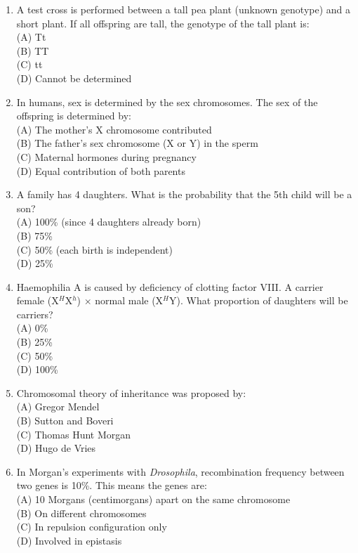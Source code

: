 \documentclass{article}
\begin{document}
\begin{enumerate}[label=Q\arabic*.]
\item A test cross is performed between a tall pea plant (unknown genotype) and a short plant. If all offspring are tall, the genotype of the tall plant is:
\\(A) Tt
\\(B) TT
\\(C) tt
\\(D) Cannot be determined

\item In humans, sex is determined by the sex chromosomes. The sex of the offspring is determined by:
\\(A) The mother's X chromosome contributed
\\(B) The father's sex chromosome (X or Y) in the sperm
\\(C) Maternal hormones during pregnancy
\\(D) Equal contribution of both parents

\item A family has 4 daughters. What is the probability that the 5th child will be a son?
\\(A) 100\% (since 4 daughters already born)
\\(B) 75\%
\\(C) 50\% (each birth is independent)
\\(D) 25\%

\item Haemophilia A is caused by deficiency of clotting factor VIII. A carrier female (X$^H$X$^h$) $\times$ normal male (X$^H$Y). What proportion of daughters will be carriers?
\\(A) 0\%
\\(B) 25\%
\\(C) 50\%
\\(D) 100\%

\item Chromosomal theory of inheritance was proposed by:
\\(A) Gregor Mendel
\\(B) Sutton and Boveri
\\(C) Thomas Hunt Morgan
\\(D) Hugo de Vries

\item In Morgan's experiments with \textit{Drosophila}, recombination frequency between two genes is 10\%. This means the genes are:
\\(A) 10 Morgans (centimorgans) apart on the same chromosome
\\(B) On different chromosomes
\\(C) In repulsion configuration only
\\(D) Involved in epistasis


\end{enumerate}
\end{document}
